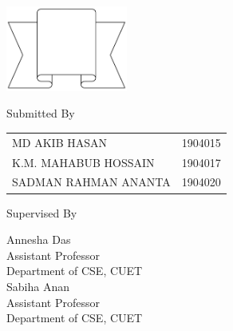 \documentclass[a4paper,12pt]{report}
\begin{document}
\begin{titlepage}
	\vspace{2cm}
	\begin{center}
		\includegraphics[width=4cm, keepaspectratio]{remarks.png}
	\end{center}
	\parbox[l]{.5\linewidth}{\begin{center}
			Submitted By
		\end{center}
		\raggedright
		\begin{tabular}{ll}
			MD AKIB HASAN        & 1904015 \\[.1cm]
			K.M. MAHABUB HOSSAIN & 1904017 \\[.1cm]
			SADMAN RAHMAN ANANTA & 1904020 \\
		\end{tabular}
	}
	\parbox[r]{7.8cm}{\vspace{1.5cm}
	\begin{center}
		Supervised By
	\end{center}
	\raggedleft
	Annesha Das\\
	{\footnotesize
	Assistant Professor \\
	Department of CSE, CUET}\\[0.5cm]

	Sabiha Anan\\
	{\footnotesize
	Assistant Professor \\
	Department of CSE, CUET}

	}

	\vfill
\end{titlepage}


\onehalfspacing
\end{document}
